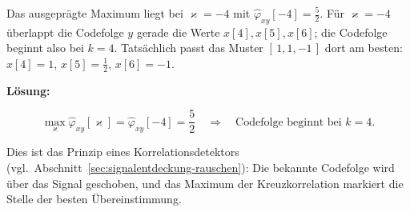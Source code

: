 \begin{beispiel}
Das ausgeprägte Maximum liegt bei $\varkappa = -4$ mit
$\hat{\varphi}_{xy}[-4] = \tfrac52$. Für $\varkappa = -4$ überlappt die
Codefolge $y$ gerade die Werte $x[4], x[5], x[6]$; die Codefolge beginnt also bei
$k = 4$. Tatsächlich passt das Muster $[\,1,1,-1\,]$ dort am besten:
$x[4] = 1$, $x[5] = \tfrac12$, $x[6] = -1$.

\textbf{Lösung:}

$$
\boxed{\;\max_{\varkappa} \hat{\varphi}_{xy}[\varkappa]
= \hat{\varphi}_{xy}[-4] = \frac{5}{2}
\quad\Longrightarrow\quad
\text{Codefolge beginnt bei } k = 4.\;}
$$

Dies ist das Prinzip eines Korrelationsdetektors (vgl.\
Abschnitt~\ref{sec:signalentdeckung-rauschen}): Die bekannte Codefolge wird über
das Signal geschoben, und das Maximum der Kreuzkorrelation markiert die Stelle
der besten Übereinstimmung.

\end{beispiel}
